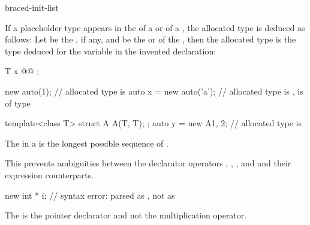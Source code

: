 \begin{bnf}
\br
    \terminal{(}  \terminal{)}\br
    braced-init-list
\end{bnf}

\pnum
If a placeholder type appears in the
 of a  or
 of a ,
the allocated type is deduced as follows:
Let
 be the , if any,
and
 be the  or  of
the , then the allocated type is the type
deduced for the variable  in the invented
declaration:

\begin{codeblock}
T x @\textrm{}@ ;
\end{codeblock}

\begin{example}
\begin{codeblock}
new auto(1);                    // allocated type is 
auto x = new auto('a');         // allocated type is ,  is of type 

template<class T> struct A { A(T, T); };
auto y = new A{1, 2};           // allocated type is 
\end{codeblock}
\end{example}

\pnum
The  in a  is the longest
possible sequence of .
\begin{note}
This prevents ambiguities between the declarator operators \tcode{\&}, \tcode{\&\&},
\tcode{*}, and \tcode{[]} and their expression counterparts.
\end{note}
\begin{example}
\begin{codeblock}
new int * i;                    // syntax error: parsed as , not as 
\end{codeblock}
The \tcode{*} is the pointer declarator and not the multiplication
operator.
\end{example}


